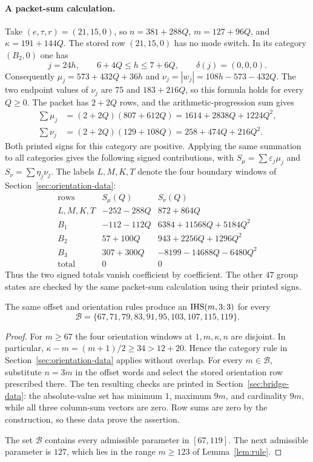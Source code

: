 \begin{samepage}
\paragraph{A packet-sum calculation.}
Take $(e,\tau,r)=(21,15,0)$, so $n=381+288Q$, $m=127+96Q$, and
$\kappa=191+144Q$. The stored row $(21,15,0)$ has no mode switch.
In its category $(B_2,0)$ one has
\[
 j=24h,\qquad 6+4Q\le h\le7+6Q,\qquad \delta(j)=(0,0,0).
\]
Consequently $\mu_j=573+432Q+36h$ and $\nu_j=|w_j|=108h-573-432Q$.
The two endpoint values of $\nu_j$ are $75$ and $183+216Q$, so this formula holds for every $Q\ge0$.
The packet has $2+2Q$ rows, and the arithmetic-progression sum gives
\[
\begin{aligned}
 \sum\mu_j&=(2+2Q)(807+612Q)=1614+2838Q+1224Q^2,\\
 \sum\nu_j&=(2+2Q)(129+108Q)=258+474Q+216Q^2.
\end{aligned}
\]
Both printed signs for this category are positive. Applying the same summation to all categories
gives the following signed contributions, with $S_\mu=\sum\varepsilon_j\mu_j$ and
$S_\nu=\sum\eta_j\nu_j$. The labels $L,M,K,T$ denote the four boundary windows of
Section~\ref{sec:orientation-data}:
\[
\begin{array}{c|r|r}
\text{rows}&S_\mu(Q)&S_\nu(Q)\\\hline
L,M,K,T&-252-288Q&872+864Q\\
B_1&-112-112Q&6384+11568Q+5184Q^2\\
B_2&57+100Q&943+2256Q+1296Q^2\\
B_3&307+300Q&-8199-14688Q-6480Q^2\\\hline
\text{total}&0&0
\end{array}
\]
Thus the two signed totals vanish coefficient by coefficient. The other $47$ group states
are checked by the same packet-sum calculation using their printed signs.
\end{samepage}

\begin{lemma}\label{lem:bridge}
The same offset and orientation rules produce an $\mathrm{IHS}(m,3;3)$ for every
\[
\mathcal B=\{67,71,79,83,91,95,103,107,115,119\}.
\]
\end{lemma}
\begin{proof}
For $m\ge67$ the four orientation windows at $1,m,\kappa,n$ are disjoint. In particular,
$\kappa-m=(m+1)/2\ge34>12+20$. Hence the category rule in
Section~\ref{sec:orientation-data} applies without overlap. For every $m\in\mathcal B$, substitute
$n=3m$ in the offset words and select the stored orientation row prescribed there. The ten resulting
checks are printed in Section~\ref{sec:bridge-data}: the absolute-value set has minimum $1$, maximum
$9m$, and cardinality $9m$, while all three column-sum vectors are zero. Row sums are zero by the
construction, so these data prove the assertion.

The set $\mathcal B$ contains every admissible parameter in $[67,119]$.
The next admissible parameter is $127$, which lies in the range $m\ge123$
of Lemma~\ref{lem:rule}.
\end{proof}

